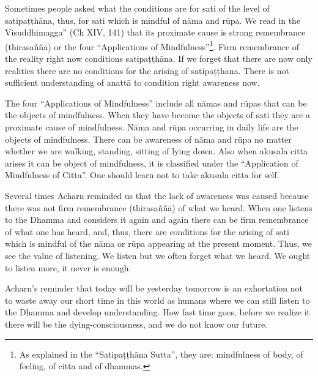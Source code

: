 Sometimes people asked what the conditions are for sati of the level of
satipaṭṭhāna, thus, for sati which is mindful of nāma and rūpa. We read
in the Visuddhimagga'' (Ch XIV, 141) that its proximate cause is strong
remembrance (thirasaññā) or the four ``Applications of Mindfulness''\footnote{As explained in the ``Satipaṭṭhāna
Sutta'', they are: mindfulness of body, of feeling, of citta and of
dhammas.}.
Firm remembrance of the reality right now conditions satipaṭṭhāna. If we
forget that there are now only realities there are no conditions for the
arising of satipaṭṭhana. There is not sufficient understanding of anattā
to condition right awareness now.

The four ``Applications of Mindfulness'' include all nāmas and rūpas
that can be the objects of mindfulness. When they have become the
objects of sati they are a proximate cause of mindfulness. Nāma and rūpa
occurring in daily life are the objects of mindfulness. There can be
awareness of nāma and rūpa no matter whether we are walking, standing,
sitting of lying down. Also when akusala citta arises it can be object
of mindfulness, it is classified under the ``Application of Mindfulness
of Citta''. One should learn not to take akusala citta for self.

Several times Acharn reminded us that the lack of awareness was caused
because there was not firm remembrance (thirasaññā) of what we heard.
When one listens to the Dhamma and considers it again and again there
can be firm remembrance of what one has heard, and, thus, there are
conditions for the arising of sati which is mindful of the nāma or rūpa
appearing at the present moment. Thus, we see the value of listening. We
listen but we often forget what we heard. We ought to listen more, it
never is enough.

Acharn's reminder that today will be yesterday tomorrow is an
exhortation not to waste away our short time in this world as humans
where we can still listen to the Dhamma and develop understanding. How
fast time goes, before we realize it there will be the
dying-consciousness, and we do not know our future.

